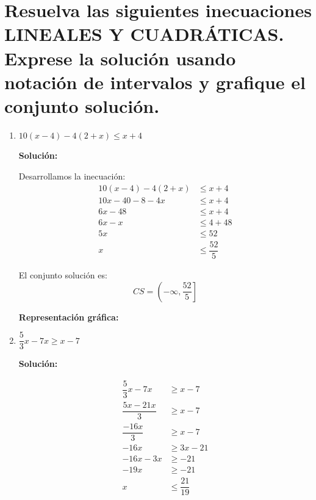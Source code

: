 \documentclass[12pt]{article}
\newcommand{\solucion}{%
    \vspace{0.8em}%
    \textbf{Solución:}%
}
\begin{document}
\section[Inecuaciones lineales y cuadráticas]{Resuelva las siguientes inecuaciones LINEALES Y CUADRÁTICAS. Exprese la solución usando notación de intervalos y grafique el conjunto solución.}

\begin{enumerate}[label=\alph*.-]
    \item $10(x - 4) - 4(2 + x) \leq x + 4$

    \solucion

    Desarrollamos la inecuación:
    \begin{align*}
    10(x - 4) - 4(2 + x) &\leq x + 4 \\[0.3em]
    10x - 40 - 8 - 4x &\leq x + 4 \\[0.3em]
    6x - 48 &\leq x + 4 \\[0.3em]
    6x - x &\leq 4 + 48 \\[0.3em]
    5x &\leq 52 \\[0.3em]
    x &\leq \dfrac{52}{5}
    \end{align*}

    El conjunto solución es:
    \[
    \boxed{CS = \left(-\infty, \dfrac{52}{5}\right]}
    \]

    \textbf{Representación gráfica:}

    \begin{center}
    \end{center}

    \newpage
    \item $\dfrac{5}{3}x - 7x \geq x - 7$

    \solucion
    \begin{align*}
    \dfrac{5}{3}x - 7x &\geq x - 7 \\[0.3em]
    \dfrac{5x - 21x}{3} &\geq x - 7 \\[0.3em]
    \dfrac{-16x}{3} &\geq x - 7 \\[0.3em]
    -16x &\geq 3x - 21 \\[0.3em]
    -16x - 3x &\geq -21 \\[0.3em]
    -19x &\geq -21 \\[0.3em]
    x &\leq \dfrac{21}{19}
    \end{align*}


\end{enumerate}
\end{document}
